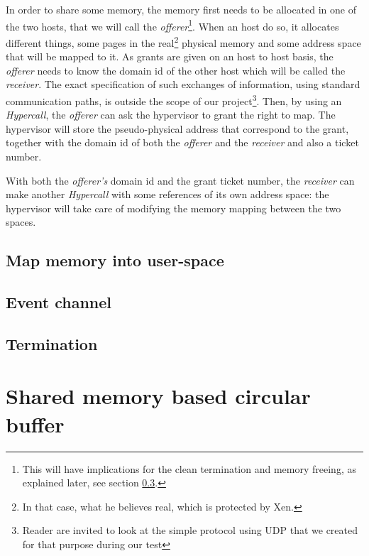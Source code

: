 \documentclass[journal]{IEEEtran}
\begin{document}
In order to share some memory, the memory first needs to be allocated in one of the two hosts, that we will call the \emph{offerer}\footnote{This will have implications for the clean termination and memory freeing, as explained later, see section \ref{Termination}.}. When an host do so, it allocates different things, some pages in the real\footnote{In that case, what he believes real, which is protected by Xen.} physical memory and some address space that will be mapped to it. As grants are given on an host to host basis, the \emph{offerer} needs to know the domain id of the other host which will be called the \emph{receiver}. The exact specification of such exchanges of information, using standard communication paths, is outside the scope of our project\footnote{Reader are invited to look at the simple protocol using UDP that we created for that purpose during our test}. Then, by using an \emph{Hypercall}, the \emph{offerer} can ask the hypervisor to grant the right to map. The hypervisor will store the pseudo-physical address that correspond to the grant, together with the domain id of both the \emph{offerer} and the \emph{receiver} and also a ticket number.

With both the \emph{offerer's} domain id and the grant ticket number, the \emph{receiver} can make another \emph{Hypercall} with some references of its own address space: the hypervisor will take care of modifying the memory mapping between the two spaces.

\subsection{Map memory into user-space}



\subsection{Event channel}



\subsection{Termination}
\label{Termination}








\section{Shared memory based circular buffer}
\end{document}
